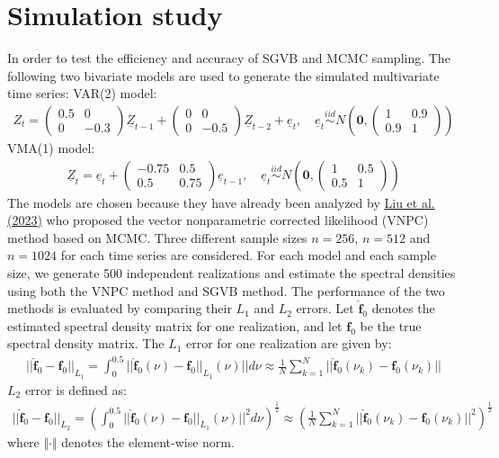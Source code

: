 \documentclass[12pt,a4paper]{article}
\begin{document}
\section{Simulation study}
In order to test the efficiency and accuracy of SGVB and MCMC sampling. The following two bivariate models are used to generate the simulated multivariate time series:
VAR(2) model:
\begin{align}
Z_t = \begin{pmatrix}0.5 & 0 \\0 & -0.3\end{pmatrix}\underline{Z}_{t-1}+\begin{pmatrix}0 & 0 \\0 & -0.5\end{pmatrix}\underline{Z}_{t-2}+\underline{e}_t, \quad \underline{e}_t\overset{iid}{\sim}N \left(\bm{0}, \begin{pmatrix}1 & 0.9 \\0.9 & 1\end{pmatrix} \right)
\end{align}
VMA(1) model:
\begin{align}
\underline{Z}_t =\underline{e}_t+\begin{pmatrix}-0.75 & 0.5 \\0.5 & 0.75\end{pmatrix}\underline{e}_{t-1}, \quad \underline{e}_t\overset{iid}{\sim}N \left(\bm{0}, \begin{pmatrix}1 & 0.5 \\0.5 & 1\end{pmatrix}\right)
\end{align}
The models are chosen because they have already been analyzed by \hyperref[liu 2023]{Liu et al. (2023)} who proposed the vector nonparametric corrected likelihood (VNPC) method based on MCMC. Three different sample sizes $n=256$, $n=512$ and $n=1024$ for each time series are considered. For each model and each sample size, we generate 500 independent realizations and estimate the spectral densities using both the VNPC method and SGVB method. The performance of the two methods is evaluated by comparing their $L_1$ and $L_2$ errors. Let $\hat{\bm{f}}_0$ denotes the estimated spectral density matrix for one realization, and let $\bm{f}_0$ be the true spectral density matrix. The $L_1$ error for one realization are given by:
\begin{align*}
||\hat{\bm{f}}_0 - \bm{f}_0||_{L_1} = \int_{0}^{0.5} ||\hat{\bm{f}}_0(\nu) - \bm{f}_0||_{L_1}(\nu)|| d\nu \approx \frac{1}{N} \sum_{k=1}^{N}||\hat{\bm{f}}_0(\nu_k)-\bm{f}_0(\nu_k)||
\end{align*}
$L_2$ error is defined as:
\begin{align*}
||\hat{\bm{f}}_0 - \bm{f}_0||_{L_2} = \left(\int_{0}^{0.5} ||\hat{\bm{f}}_0(\nu) - \bm{f}_0||_{L_1}(\nu)||^2 d\nu \right)^{\frac{1}{2}} \approx \left(\frac{1}{N} \sum_{k=1}^{N}||\hat{\bm{f}}_0(\nu_k)-\bm{f}_0(\nu_k)||^2 \right)^{\frac{1}{2}}
\end{align*}
where $\Vert \cdot \Vert$ denotes the element-wise norm. 
\end{document}
